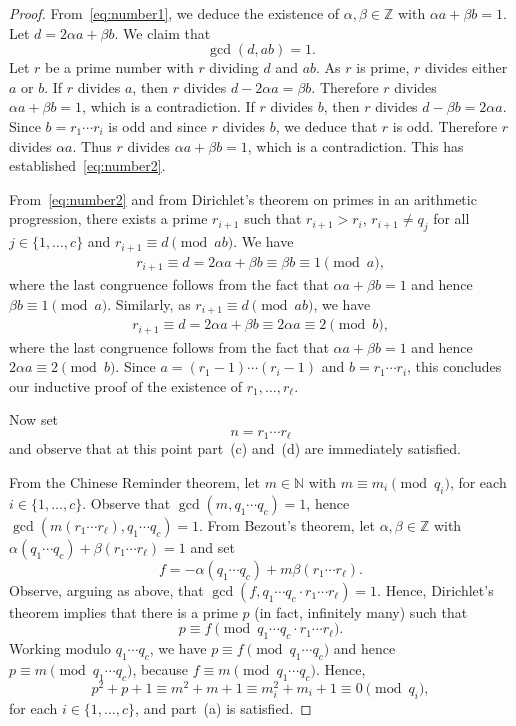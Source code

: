 \documentclass{amsart}
\begin{document}
\begin{proof}
From~\eqref{eq:number1}, we deduce the existence of $\alpha,\beta\in \mathbb{Z}$ with $\alpha a+\beta b=1$. Let $d=2\alpha a+\beta b$. We claim that
\begin{equation}\label{eq:number2}
\gcd(d,ab)=1.
\end{equation}
Let $r$ be a prime number with $r$ dividing $d$ and $ab$. As $r$ is prime, $r$ divides either $a$ or $b$. If $r$ divides $a$, then $r$ divides $d-2\alpha a=\beta b$. Therefore $r$ divides $\alpha a+\beta b=1$, which is a contradiction. If $r$ divides $b$, then $r$ divides $d-\beta b=2\alpha a$. Since $b=r_1\cdots r_i$ is odd and since $r$ divides $b$, we deduce that $r$ is odd. Therefore $r$ divides $\alpha a$. Thus $r$ divides  $\alpha a+\beta b=1$, which is a contradiction. This has established~\eqref{eq:number2}.

From~\eqref{eq:number2} and from Dirichlet's theorem on primes in an arithmetic progression, there exists a prime  $r_{i+1}$ such that
$r_{i+1}>r_i$, $r_{i+1} \neq q_j$ for all  $j \in \{ 1, \ldots,  c\}$ and  $r_{i+1}\equiv d\pmod{ab}$.
We have
\begin{align*}
r_{i+1}\equiv d= 2\alpha a+\beta b \equiv \beta b \equiv 1\pmod{a},
\end{align*}
where the last congruence follows from the fact that $\alpha a+\beta b=1$ and hence $\beta b\equiv 1\pmod a$. Similarly, as $r_{i+1}\equiv d\pmod{ab}$, we have
\begin{align*}
r_{i+1}\equiv d= 2\alpha a+\beta b \equiv 2\alpha a \equiv 2\pmod{b},
\end{align*}
where the last congruence follows from the fact that $\alpha a+\beta b=1$ and hence $2\alpha a\equiv 2\pmod b$. Since $a=(r_1-1)\cdots (r_i-1)$ and $b=r_1\cdots r_i$, this concludes our inductive proof of the existence of $r_1,\ldots,r_\ell$.

Now set $$n=r_1\cdots r_\ell$$
and observe that at this point part~(c) and~(d) are immediately satisfied.


From the Chinese Reminder theorem, let $m\in\mathbb{N}$ with $m\equiv m_i\pmod{q_i}$, for each $i\in \{1,\ldots,c\}$. Observe that $\gcd(m,q_1\cdots q_c)=1$, hence $\gcd(m(r_1\cdots r_{\ell}), q_1\cdots q_c) = 1$.
From Bezout's theorem, let  $\alpha,\beta\in \mathbb{Z}$ with $\alpha (q_1\cdots q_c)+\beta(r_1\cdots r_\ell)=1$ and set $$f=-\alpha(q_1\cdots q_c)+m\beta(r_1\cdots r_\ell).$$
Observe, arguing as above, that $\gcd(f,q_1\cdots q_c\cdot r_1\cdots r_\ell)=1$.
Hence, Dirichlet's theorem implies that there is  a prime $p$  (in fact,  infinitely many) such that 
\begin{equation}\label{eq:number13}p\equiv f\pmod {q_1\cdots q_c\cdot r_1\cdots r_\ell}.
\end{equation}
Working modulo $q_1\cdots q_c$, we have $p\equiv f\pmod{q_1\cdots q_c}$ and hence $p\equiv m\pmod{q_1\cdots q_c}$, because $f\equiv m\pmod{q_1\cdots q_c}$.
Hence, 
$$p^2+p+1\equiv m^2+m+1 \equiv m_i^2+m_i+1 \equiv 0\pmod{q_i}, $$
for each $i\in \{1,\ldots,c\}$, and  part~(a) is  satisfied.


\end{proof}
\end{document}
